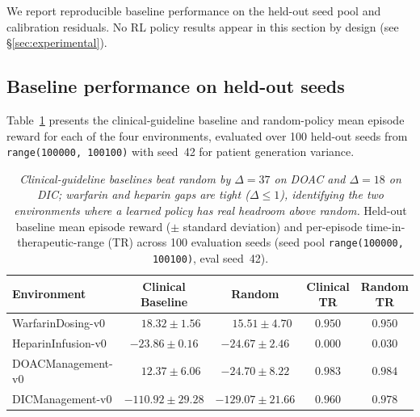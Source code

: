 \documentclass[11pt]{article}
\begin{document}
We report reproducible baseline performance on the held-out seed pool and calibration residuals. No RL policy results appear in this section by design (see \S\ref{sec:experimental}).

\subsection{Baseline performance on held-out seeds}

Table~\ref{tab:results} presents the clinical-guideline baseline and random-policy mean episode reward for each of the four environments, evaluated over 100 held-out seeds from \texttt{range(100000, 100100)} with seed~42 for patient generation variance.

\begin{table}[ht]
\centering
\caption{\emph{Clinical-guideline baselines beat random by $\Delta=37$ on DOAC and $\Delta=18$ on DIC; warfarin and heparin gaps are tight ($\Delta\leq1$), identifying the two environments where a learned policy has real headroom above random.} Held-out baseline mean episode reward ($\pm$ standard deviation) and per-episode time-in-therapeutic-range (TR) across 100 evaluation seeds (seed pool \texttt{range(100000, 100100)}, eval seed~42).}
\label{tab:results}
\begin{tabular}{@{}lcccc@{}}
\toprule
\textbf{Environment} & \textbf{Clinical Baseline} & \textbf{Random} & \textbf{Clinical TR} & \textbf{Random TR} \\
\midrule
WarfarinDosing-v0    & $\phantom{-}18.32 \pm 1.56$   & $\phantom{-}15.51 \pm 4.70$  & $0.950$ & $0.950$ \\
HeparinInfusion-v0   & $-23.86 \pm 0.16$   & $-24.67 \pm 2.46$  & $0.000$ & $0.030$ \\
DOACManagement-v0    & $\phantom{-}12.37 \pm 6.06$   & $-24.70 \pm 8.22$  & $0.983$ & $0.984$ \\
DICManagement-v0     & $-110.92 \pm 29.28$ & $-129.07 \pm 21.66$ & $0.960$ & $0.978$ \\
\bottomrule
\end{tabular}
\end{table}
\end{document}
